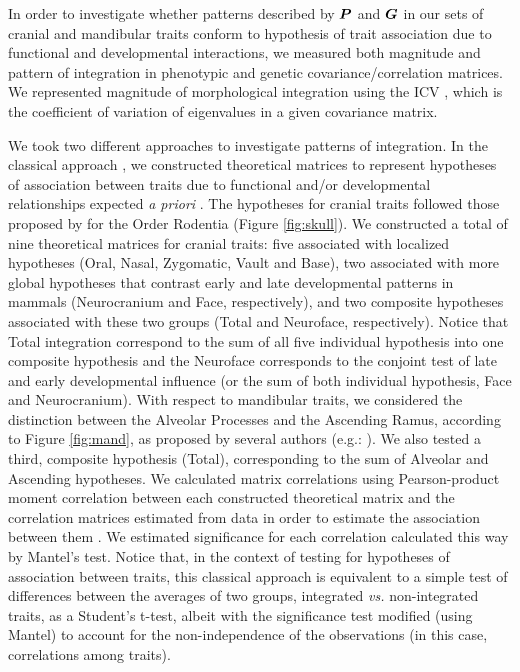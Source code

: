 \documentclass [twocolumn, natbib, nospthms, 10pt] {svjour3}
\begin{document}
In order to investigate whether patterns described by $\boldsymbol{P}$ and
$\boldsymbol{G}$ in our sets of cranial and mandibular traits conform to
hypothesis of trait association due to functional and developmental
interactions, we measured both magnitude and pattern of integration in
phenotypic and genetic covariance/correlation matrices. We represented
magnitude of morphological integration using the ICV
\citep{shirai_skull_2010}, which is the coefficient of variation of
eigenvalues in a given covariance matrix.

We took two different approaches to investigate patterns of
integration.  In the classical approach
\citep{olson_morphological_1958, cheverud_morphological_1995}, we
constructed theoretical matrices to represent hypotheses of
association between traits due to functional and/or developmental
relationships expected \emph{a priori}
\citep{cheverud_morphological_1995}. The hypotheses for cranial traits
followed those proposed by \citet{porto_evolution_2009} for the Order
Rodentia (Figure \ref{fig:skull}). We constructed a total of nine
theoretical matrices for cranial traits: five associated with
localized hypotheses (Oral, Nasal, Zygomatic, Vault and Base), two
associated with more global hypotheses that contrast early and late
developmental patterns in mammals (Neurocranium and Face,
respectively), and two composite hypotheses associated with these two
groups (Total and Neuroface, respectively). Notice that Total
integration correspond to the sum of all five individual hypothesis
into one composite hypothesis and the Neuroface corresponds to the
conjoint test of late and early developmental influence (or the sum of
both individual hypothesis, Face and Neurocranium). With respect to
mandibular traits, we considered the distinction between the Alveolar
Processes and the Ascending Ramus, according to Figure \ref{fig:mand},
as proposed by several authors (e.g.:
\citealp{cheverud_pleiotropic_1997, klingenberg_integration_2004,
  willmore_comparison_2009}). We also tested a third, composite
hypothesis (Total), corresponding to the sum of Alveolar and Ascending
hypotheses. We calculated matrix correlations using Pearson-product
moment correlation between each constructed theoretical matrix and the
correlation matrices estimated from data in order to estimate the
association between them \citep{cheverud_methods_1989,
  cheverud_morphological_1995}. We estimated significance for each
correlation calculated this way by Mantel's test. Notice that, in the
context of testing for hypotheses of association between traits, this
classical approach is equivalent to a simple test of differences
between the averages of two groups, integrated \textit {vs.}
non-integrated traits, as a Student's t-test, albeit with the
significance test modified (using Mantel) to account for the
non-independence of the observations (in this case, correlations among
traits).
\end{document}

